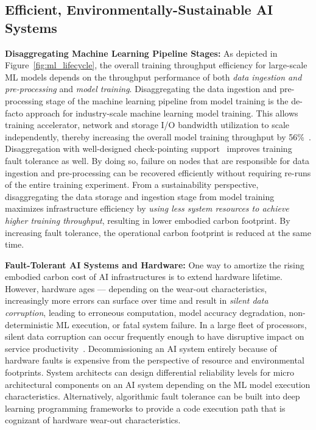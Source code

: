 \documentclass{IEEEtran}
\begin{document}
\subsection{Efficient, Environmentally-Sustainable AI Systems}
\label{sec:appendix-system-efficiency}

\textbf{Disaggregating Machine Learning Pipeline Stages:} As depicted in Figure~\ref{fig:ml_lifecycle}, the overall training throughput efficiency for large-scale ML models depends on the throughput performance of both \textit{data ingestion and pre-processing} and \textit{model training}. Disaggregating the data ingestion and pre-processing stage of the machine learning pipeline from model training is the de-facto approach for industry-scale machine learning model training. This allows training accelerator, network and storage I/O bandwidth utilization to scale independently, thereby increasing the overall model training throughput by 56\%~\cite{Zhao:arxiv:2021}. Disaggregation with well-designed check-pointing support~\cite{Maeng:arxiv:2021,Eisenman:arxiv:2021} improves training fault tolerance as well. By doing so, failure on nodes that are responsible for data ingestion and pre-processing can be recovered efficiently without requiring re-runs of the entire training experiment. From a sustainability perspective, disaggregating the data storage and ingestion stage from model training maximizes infrastructure efficiency by \textit{using less system resources to achieve higher training throughput}, resulting in lower embodied carbon footprint. By increasing fault tolerance, the operational carbon footprint is reduced at the same time.  

\textbf{Fault-Tolerant AI Systems and Hardware:}
One way to amortize the rising embodied carbon cost of AI infrastructures is to extend hardware lifetime. However, hardware ages --- depending on the wear-out characteristics, increasingly more errors can surface over time and result in \textit{silent data corruption}, leading to erroneous computation, model accuracy degradation, non-deterministic ML execution, or fatal system failure. In a large fleet of processors, silent data corruption can occur frequently enough to have disruptive impact on service productivity~\cite{Dixit:arxiv:2021,Hochschild:hotos:2021}. Decommissioning an AI system entirely because of hardware faults is expensive from the perspective of resource and environmental footprints. System architects can design differential reliability levels for micro architectural components on an AI system depending on the ML model execution characteristics. Alternatively, algorithmic fault tolerance can be built into deep learning programming frameworks to provide a code execution path that is cognizant of hardware wear-out characteristics.
\end{document}
